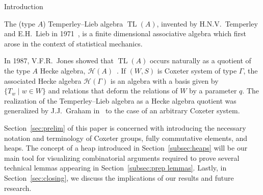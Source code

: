 \documentclass[11pt]{amsart}
\theoremstyle{definition}
\numberwithin{equation}{section}
\newcommand{\C}{\widetilde{C}}
\DeclareMathOperator{\TL}{TL}
\renewcommand{\(}{\left(}
\renewcommand{\)}{\right)}
\renewcommand{\H}{\mathcal{H}}
\begin{document}
\begin{section}{Introduction}\label{sec:intro}

The (type $A$) Temperley--Lieb algebra $\TL(A)$, invented by H.N.V.~Temperley and E.H.~Lieb in 1971~\cite{Temperley1971}, is a finite dimensional associative algebra which first arose in the context of statistical mechanics.

In 1987, V.F.R.~Jones showed that $\TL(A)$ occurs naturally as a quotient of the type $A$ Hecke algebra, $\H(A)$~\cite{Jones1999}.  If $(W,S)$ is Coxeter system of type $\Gamma$, the associated Hecke algebra $\H(\Gamma)$ is an algebra with a basis given by $\{T_w\mid w \in W\}$ and relations that deform the relations of $W$ by a parameter $q$. The realization of the Temperley--Lieb algebra as a Hecke algebra quotient was generalized by J.J.~Graham in~\cite{Graham1995} to the case of an arbitrary Coxeter system.  %


Section~\ref{sec:prelim} of this paper is concerned with introducing the necessary notation and terminology of Coxeter groups, fully commutative elements, and heaps.  The concept of a heap introduced in Section~\ref{subsec:heaps} will be our main tool for visualizing combinatorial arguments required to prove several technical lemmas appearing in Section~\ref{subsec:prep lemmas}.  
Lastly, in Section~\ref{sec:closing}, we discuss the implications of our results and future research.

\end{section}
\end{document}
